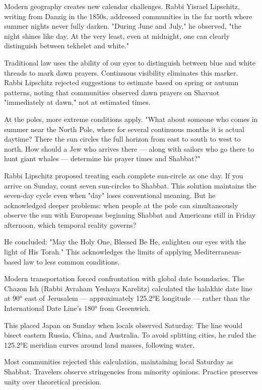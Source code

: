 Modern geography creates new calendar challenges. Rabbi Yisrael Lipschitz, writing from Danzig in the 1850s, addressed communities in the far north where summer nights never fully darken. "During June and July," he observed, "the night shines like day. At the very least, even at midnight, one can clearly distinguish between tekhelet and white." 

Traditional law uses the ability of our eyes to distinguish between blue and white threads to mark dawn prayers. Continuous visibility eliminates this marker. Rabbi Lipschitz rejected suggestions to estimate based on spring or autumn patterns, noting that communities observed dawn prayers on Shavuot "immediately at dawn," not at estimated times.

At the poles, more extreme conditions apply. "What about someone who comes in summer near the North Pole, where for several continuous months it is actual daytime? There the sun circles the full horizon from east to south to west to north. How should a Jew who arrives there — along with sailors who go there to hunt giant whales — determine his prayer times and Shabbat?"

Rabbi Lipschitz proposed treating each complete sun-circle as one day. If you arrive on Sunday, count seven sun-circles to Shabbat. This solution maintains the seven-day cycle even when "day" loses conventional meaning. But he acknowledged deeper problems: when people at the pole can simultaneously observe the sun with Europeans beginning Shabbat and Americans still in Friday afternoon, which temporal reality governs?

He concluded: "May the Holy One, Blessed Be He, enlighten our eyes with the light of His Torah." This acknowledges the limits of applying Mediterranean-based law to less common conditions.

Modern transportation forced confrontation with global date boundaries. The Chazon Ish (Rabbi Avraham Yeshaya Karelitz) calculated the halakhic date line at 90° east of Jerusalem — approximately 125.2°E longitude — rather than the International Date Line's 180° from Greenwich.

This placed Japan on Sunday when locals observed Saturday. The line would bisect eastern Russia, China, and Australia. To avoid splitting cities, he ruled the 125.2°E meridian curves around land masses, following water.

Most communities rejected this calculation, maintaining local Saturday as Shabbat. Travelers observe stringencies from minority opinions. Practice preserves unity over theoretical precision.

